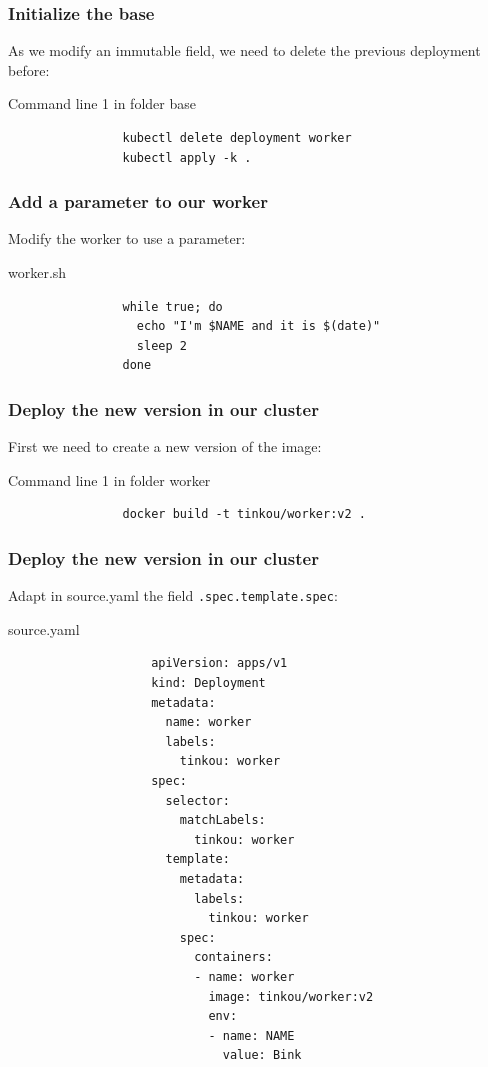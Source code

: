 	\begin{frame}[fragile]
		\frametitle{Initialize the base}
		As we modify an immutable field, we need to delete the previous deployment before:
		\begin{block}{Command line 1 in folder base}
			\begin{verbatim}
				kubectl delete deployment worker
				kubectl apply -k .
			\end{verbatim}
		\end{block}
	\end{frame}
	
	\begin{frame}[fragile]
		\frametitle{Add a parameter to our worker}
		
		Modify the worker to use a parameter:
		\begin{block}{worker.sh}
			\begin{verbatim}
				while true; do
				  echo "I'm $NAME and it is $(date)"
				  sleep 2
				done
			\end{verbatim}
		\end{block}
	\end{frame}
	
	\begin{frame}[fragile]
		\frametitle{Deploy the new version in our cluster}
		
		First we need to create a new version of the image:
		\begin{block}{Command line 1 in folder worker}
			\begin{verbatim}
				docker build -t tinkou/worker:v2 .
			\end{verbatim}
		\end{block}
	\end{frame}
	
	\begin{frame}[fragile]
		\frametitle{Deploy the new version in our cluster}
		
		Adapt in source.yaml the field \verb!.spec.template.spec!:
		\begin{block}{source.yaml}
			\begin{tiny}
				\begin{verbatim}
					apiVersion: apps/v1
					kind: Deployment
					metadata:
					  name: worker
					  labels:
					    tinkou: worker
					spec:
					  selector:
					    matchLabels:
					      tinkou: worker
					  template:
					    metadata:
					      labels:
					        tinkou: worker
					    spec:
					      containers:
					      - name: worker
					        image: tinkou/worker:v2
					        env:
					        - name: NAME
					          value: Bink
				\end{verbatim}
			\end{tiny}
		\end{block}
	\end{frame}
	
